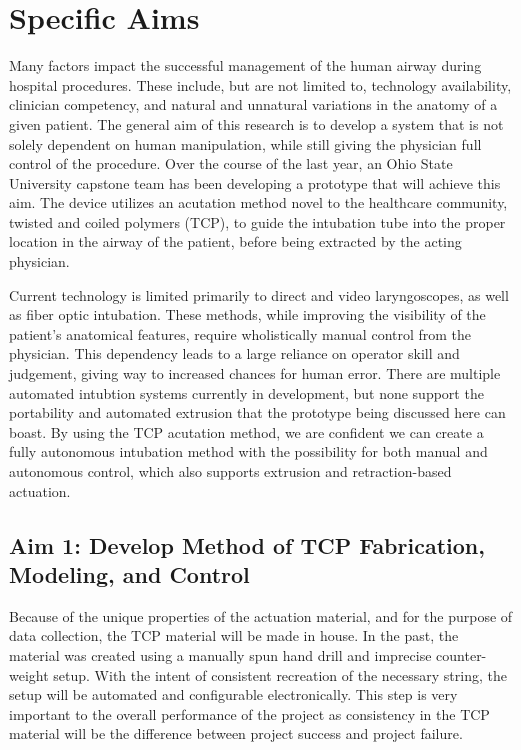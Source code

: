 \section{Specific Aims}
\label{parts:specific_aims}

Many factors impact the successful management of the human airway during hospital procedures. These include, but are not limited to, technology availability, clinician competency, and natural and unnatural variations in the anatomy of a given patient. The general aim of this research is to develop a system that is not solely dependent on human manipulation, while still giving the physician full control of the procedure. Over the course of the last year, an Ohio State University capstone team has been developing a prototype that will achieve this aim. The device utilizes an acutation method novel to the healthcare community, twisted and coiled polymers (TCP), to guide the intubation tube into the proper location in the airway of the patient, before being extracted by the acting physician.

Current technology is limited primarily to direct and video laryngoscopes, as well as fiber optic intubation. These methods, while improving the visibility of the patient's anatomical features, require wholistically manual control from the physician. This dependency leads to a large reliance on operator skill and judgement, giving way to increased chances for human error. There are multiple automated intubtion systems currently in development, but none support the portability and automated extrusion that the prototype being discussed here can boast. By using the TCP acutation method, we are confident we can create a fully autonomous intubation method with the possibility for both manual and autonomous control, which also supports extrusion and retraction-based actuation.

	\subsection{Aim 1: Develop Method of TCP Fabrication, Modeling, and Control}
	\label{subsect:aim1}
	
	Because of the unique properties of the actuation material, and for the purpose of data collection, the TCP material will be made in house. In the past, the material was created using a manually spun hand drill and imprecise counter-weight setup. With the intent of consistent recreation of the necessary string, the setup will be automated and configurable electronically. This step is very important to the overall performance of the project as consistency in the TCP material will be the difference between project success and project failure.
	
